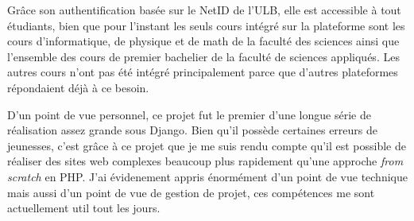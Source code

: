 \documentclass[a4paper,12pt]{article}
\begin{document}
Grâce son authentification basée sur le NetID de l'ULB, elle est accessible à tout étudiants,
bien que pour l'instant les seuls cours intégré sur la plateforme sont
les cours d'informatique, de physique et de math de la faculté des sciences ainsi
que l'ensemble des cours de premier bachelier de la faculté de sciences appliqués.
Les autres cours n'ont pas été intégré principalement parce que d'autres plateformes
répondaient déjà à ce besoin.

D'un point de vue personnel, ce projet fut le premier d'une longue série de réalisation
assez grande sous Django. Bien qu'il possède certaines erreurs de jeunesses, c'est grâce
à ce projet que je me suis rendu compte qu'il est possible de réaliser des sites
web complexes beaucoup plus rapidement qu'une approche \textit{from scratch} en PHP.
J'ai évidenement appris énormément d'un point de vue technique mais aussi d'un
point de vue de gestion de projet, ces compétences me sont actuellement util tout les jours.
\end{document}
